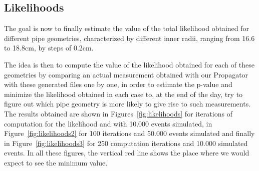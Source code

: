 \documentclass[a4paper, 11pt]{report}
\begin{document}
\subsection{Likelihoods}

The goal is now to finally estimate the value of the total likelihood obtained for different pipe geometries, characterized by different inner radii, ranging from 16.6 to 18.8cm, by steps of 0.2cm.

The idea is then to compute the value of the likelihood obtained for each of these geometries by comparing an actual measurement obtained with our Propagator with these generated files one by one, in order to estimate the p-value and minimize the likelihood obtained in each case to, at the end of the day, try to figure out which pipe geometry is more likely to give rise to such measurements. The results obtained are shown in Figures~\ref{fig:likelihoods} for iterations of computation for the likelihood and with 10.000 events simulated, in Figure~\ref{fig:likelihoods2} for 100 iterations and 50.000 events simulated and finally in Figure~\ref{fig:likelihoods3} for 250 computation iterations and 10.000 simulated events. In all these figures, the vertical red line shows the place where we would expect to see the minimum value.
\end{document}
